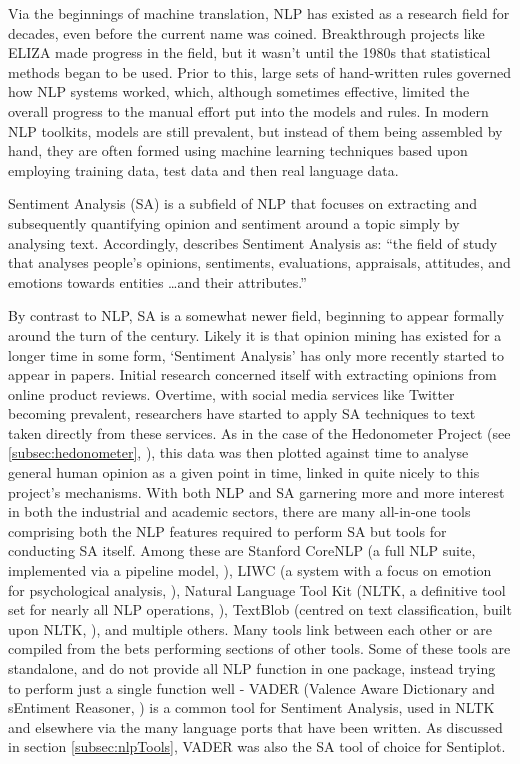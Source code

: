 \documentclass{article}
\begin{document}
{        Via the beginnings of machine translation, NLP has existed as a research field for decades, even before the current name was coined. Breakthrough projects like ELIZA made progress in the field, but it wasn't until the 1980s that statistical methods began to be used. Prior to this, large sets of hand-written rules governed how NLP systems worked, which, although sometimes effective, limited the overall progress to the manual effort put into the models and rules. In modern NLP toolkits, models are still prevalent, but instead of them being assembled by hand, they are often formed using machine learning techniques based upon employing training data, test data and then real language data.

        Sentiment Analysis (SA) is a subfield of NLP that focuses on extracting and subsequently quantifying opinion and sentiment around a topic simply by analysing text. Accordingly, \cite{liu2012sentiment} describes Sentiment Analysis as: ``the field of study that analyses people’s opinions, sentiments, evaluations, appraisals, attitudes, and emotions towards entities \dots and their attributes.''
        
        By contrast to NLP, SA is a somewhat newer field, beginning to appear formally around the turn of the century. Likely it is that opinion mining has existed for a longer time in some form, `Sentiment Analysis' has only more recently started to appear in papers. Initial research concerned itself with extracting opinions from online product reviews. Overtime, with social media services like Twitter becoming prevalent, researchers have started to apply SA techniques to text taken directly from these services. As in the case of the Hedonometer Project (see \ref{subsec:hedonometer}, \cite{reagan2016emotional}), this data was then plotted against time to analyse general human opinion as a given point in time, linked in quite nicely to this project's mechanisms.
        With both NLP and SA garnering more and more interest in both the industrial and academic sectors, there are many all-in-one tools comprising both the NLP features required to perform SA but tools for conducting SA itself. Among these are Stanford CoreNLP (a full NLP suite, implemented via a pipeline model, \cite{stanfordNLP}), LIWC (a system with a focus on emotion for psychological analysis, \cite{tausczik2010psychological}), Natural Language Tool Kit (NLTK, a definitive tool set for nearly all NLP operations, \cite{loper2002nltk}), TextBlob (centred on text classification, built upon NLTK, \cite{textblob}), and multiple others. Many tools link between each other or are compiled from the bets performing sections of other tools. Some of these tools are standalone, and do not provide all NLP function in one package, instead trying to perform just a single function well - VADER (Valence Aware Dictionary and sEntiment Reasoner, \cite{hutto2014vader}) is a common tool for Sentiment Analysis, used in NLTK and elsewhere via the many language ports that have been written. As discussed in section \ref{subsec:nlpTools}, VADER was also the SA tool of choice for Sentiplot.

}
\end{document}
